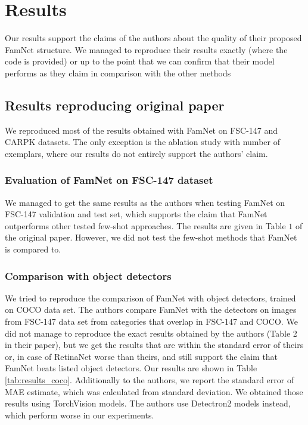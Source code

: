 \section{Results}
\label{sec:results}

Our results support the claims of the authors about the quality of their proposed FamNet structure. We managed to reproduce their results exactly (where the code is provided) or up to the point that we can confirm that their model performs as they claim in comparison with the other methods

\subsection{Results reproducing original paper}

We reproduced most of the results obtained with FamNet on FSC-147 and CARPK datasets. The only exception is the ablation study with number of exemplars, where our results do not entirely support the authors' claim.

\subsubsection{Evaluation of FamNet on FSC-147 dataset}

We managed to get the same results as the authors when testing FamNet on FSC-147 validation and test set, which supports the claim that FamNet outperforms other tested few-shot approaches. The results are given in Table $1$ of the original paper. However, we did not test the few-shot methods that FamNet is compared to.

\subsubsection{Comparison with object detectors}

We tried to reproduce the comparison of FamNet with object detectors, trained on COCO data set. The authors compare FamNet with the detectors on images from FSC-147 data set from categories that overlap in FSC-147 and COCO. We did not manage to reproduce the exact results obtained by the authors (Table 2 in their paper), but we get the results that are within the standard error of theirs or, in case of RetinaNet worse than theirs, and still support the claim that FamNet beats listed object detectors. Our results are shown in Table \ref{tab:results_coco}. Additionally to the authors, we report the standard error of MAE estimate, which was calculated from standard deviation. We obtained those results using TorchVision models. The authors use Detectron2 models instead, which perform worse in our experiments.

